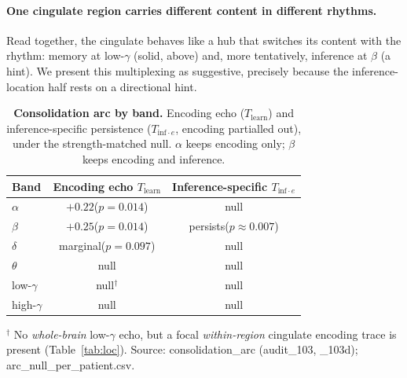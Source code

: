 \documentclass[11pt]{article}
\newcommand{\tab}[1]{Table~\ref{#1}}
\begin{document}
\paragraph{One cingulate region carries different content in different rhythms.}
Read together, the cingulate behaves like a hub that switches its content with
the rhythm: memory at low-$\gamma$ (solid, above) and, more tentatively,
inference at $\beta$ (a hint). We present this multiplexing as suggestive,
precisely because the inference-location half rests on a directional hint.

\begin{table}[t]
\centering
\caption{\textbf{Consolidation arc by band.} Encoding echo
($T_{\text{learn}}$) and inference-specific persistence
($T_{\text{inf}\cdot e}$, encoding partialled out), under the strength-matched
null. $\alpha$ keeps encoding only; $\beta$ keeps encoding and inference.}
\label{tab:arc}
\begin{tabular}{lcc}
\toprule
Band & Encoding echo $T_{\text{learn}}$ & Inference-specific $T_{\text{inf}\cdot e}$ \\
\midrule
$\alpha$       & $+0.22$\;($p=0.014$) & null \\
$\beta$        & $+0.25$\;($p=0.014$) & persists\;($p\approx0.007$) \\
$\delta$       & marginal\;($p=0.097$) & null \\
$\theta$       & null & null \\
low-$\gamma$   & null$^{\dagger}$ & null \\
high-$\gamma$  & null & null \\
\bottomrule
\end{tabular}
\par\smallskip
{\footnotesize $^{\dagger}$ No \emph{whole-brain} low-$\gamma$ echo, but a focal
\emph{within-region} cingulate encoding trace is present (\tab{tab:loc}).
Source: consolidation\_arc (audit\_103, \_103d); arc\_null\_per\_patient.csv.}
\end{table}
\end{document}
